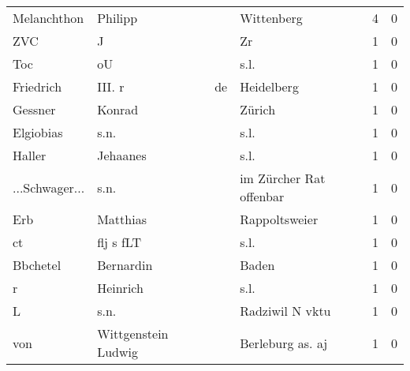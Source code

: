 \begin{center}
\begin{tiny}
\begin{longtabu}{llllrr}
              Melanchthon &                            Philipp &             &                                  Wittenberg &          4 &         0 \\
                      ZVC &                                  J &             &                                          Zr &          1 &         0 \\
                      Toc &                                 oU &             &                                        s.l. &          1 &         0 \\
                Friedrich &                            III.  r &          de &                                  Heidelberg &          1 &         0 \\
                  Gessner &                             Konrad &             &                                      Zürich &          1 &         0 \\
                Elgiobias &                               s.n. &             &                                        s.l. &          1 &         0 \\
                   Haller &                           Jehaanes &             &                                        s.l. &          1 &         0 \\
           ...Schwager... &                               s.n. &             &                     im Zürcher Rat offenbar &          1 &         0 \\
                      Erb &                           Matthias &             &                               Rappoltsweier &          1 &         0 \\
                       ct &                          flj s fLT &             &                                        s.l. &          1 &         0 \\
                 Bbchetel &                          Bernardin &             &                                       Baden &          1 &         0 \\
                        r &                           Heinrich &             &                                        s.l. &          1 &         0 \\
                        L &                               s.n. &             &                             Radziwil N vktu &          1 &         0 \\
                      von &                Wittgenstein Ludwig &             &                            Berleburg as. aj &          1 &         0 \\

\end{longtabu}
\end{tiny}
\end{center}
